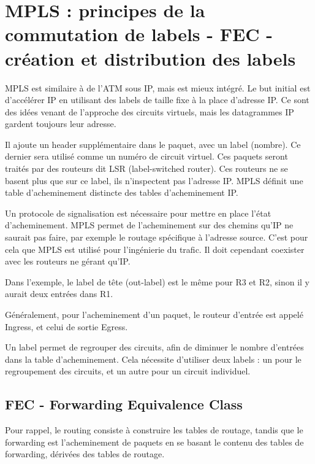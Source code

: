 \chapter{MPLS : principes de la commutation de labels - FEC - création et distribution des labels}

MPLS est similaire à de l'ATM sous IP, mais est mieux intégré. Le but initial est d'accélérer IP en utilisant des labels de taille fixe à la place d'adresse IP. Ce sont des idées venant de l'approche des circuits virtuels, mais les datagrammes IP gardent toujours leur adresse.
	
	
	Il ajoute un header supplémentaire dans le paquet, avec un label (nombre). Ce dernier sera utilisé comme un numéro de circuit virtuel. Ces paquets seront traités par des routeurs dit LSR (label-switched router). Ces routeurs ne se basent plus que sur ce label, ils n'inspectent pas l'adresse IP. MPLS définit une table d'acheminement distincte des tables d'acheminement IP.
	
	Un protocole de signalisation est nécessaire pour mettre en place l'état d'acheminement. MPLS permet de l'acheminement sur des chemins qu'IP ne saurait pas faire, par exemple le routage spécifique à l'adresse source. C'est pour cela que MPLS est utilisé pour l'ingénierie du trafic. Il doit cependant coexister avec les routeurs ne gérant qu'IP.
	
	
	Dans l'exemple, le label de tête (out-label) est le même pour R3 et R2, sinon il y aurait deux entrées dans R1.
	
	Généralement, pour l'acheminement d'un paquet, le routeur d'entrée est appelé Ingress, et celui de sortie Egress.
	
	Un label permet de regrouper des circuits, afin de diminuer le nombre d'entrées dans la table d'acheminement. Cela nécessite d'utiliser deux labels : un pour le regroupement des circuits, et un autre pour un circuit individuel.
	
	
		\section{FEC - Forwarding Equivalence Class}
		
		Pour rappel, le routing consiste à construire les tables de routage, tandis que le forwarding est l'acheminement de paquets en se basant le contenu des tables de forwarding, dérivées des tables de routage.
		

